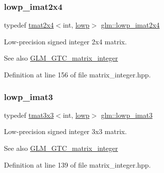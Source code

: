 \subsubsection{\texorpdfstring{lowp\_imat2x4}{lowp\_imat2x4}}
{\footnotesize\ttfamily typedef \mbox{\hyperlink{structglm_1_1tmat2x4}{tmat2x4}}$<$int, \mbox{\hyperlink{namespaceglm_a0f04f086094c747d227af4425893f545ae161af3fc695e696ce3bf69f7332bc2d}{lowp}}$>$ \mbox{\hyperlink{group__gtc__matrix__integer_gaf664d339f1b66e62ed07c913e60be940}{glm\+::lowp\+\_\+imat2x4}}}

Low-\/precision signed integer 2x4 matrix. \begin{DoxySeeAlso}{See also}
\mbox{\hyperlink{group__gtc__matrix__integer}{G\+L\+M\+\_\+\+G\+T\+C\+\_\+matrix\+\_\+integer}} 
\end{DoxySeeAlso}


Definition at line 156 of file matrix\+\_\+integer.\+hpp.

\mbox{\label{group__gtc__matrix__integer_ga2f7d17630aa9e27bb9e62f98603a4d7e}} 
\subsubsection{\texorpdfstring{lowp\_imat3}{lowp\_imat3}}
{\footnotesize\ttfamily typedef \mbox{\hyperlink{structglm_1_1tmat3x3}{tmat3x3}}$<$int, \mbox{\hyperlink{namespaceglm_a0f04f086094c747d227af4425893f545ae161af3fc695e696ce3bf69f7332bc2d}{lowp}}$>$ \mbox{\hyperlink{group__gtc__matrix__integer_ga2f7d17630aa9e27bb9e62f98603a4d7e}{glm\+::lowp\+\_\+imat3}}}

Low-\/precision signed integer 3x3 matrix. \begin{DoxySeeAlso}{See also}
\mbox{\hyperlink{group__gtc__matrix__integer}{G\+L\+M\+\_\+\+G\+T\+C\+\_\+matrix\+\_\+integer}} 
\end{DoxySeeAlso}


Definition at line 139 of file matrix\+\_\+integer.\+hpp.

\mbox{\label{group__gtc__matrix__integer_ga93514d2df726334e6d5edd373635d343}} 
